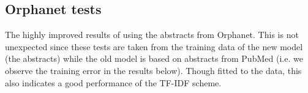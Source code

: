 \documentclass[10pt,letterpaper,two column,final]{article}
\begin{document}

\subsection{Orphanet tests}
\label{app:orphanet_old_new}
The highly improved results of using the abstracts from Orphanet. This is not unexpected since these tests are taken from the training data of the new model (the abstracts) while the old model is based on abstracts from PubMed (i.e. we observe the training error in the results below). Though fitted to the data, this also indicates a good performance of the TF-IDF scheme.

\begin{center}
\begin{small}

\end{small}
\end{center}
\end{document}
